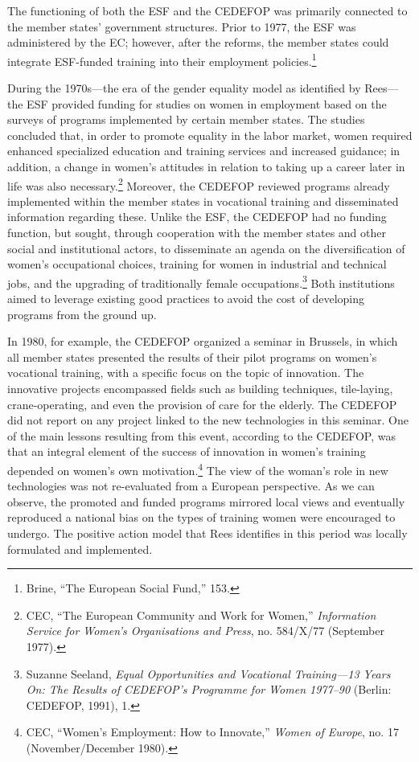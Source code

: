 \documentclass{tufte-handout}
\begin{document}
The functioning of both the ESF and the CEDEFOP was primarily connected
to the member states' government structures. Prior to 1977, the ESF was
administered by the EC; however, after the reforms, the member states
could integrate ESF-funded training into their employment
policies.\footnote{Brine, ``The European Social Fund,'' 153.}

During the 1970s---the era of the gender equality model as identified by
Rees---the ESF provided funding for studies on women in employment based
on the surveys of programs implemented by certain member states. The
studies concluded that, in order to promote equality in the labor
market, women required enhanced specialized education and training
services and increased guidance; in addition, a change in women's
attitudes in relation to taking up a career later in life was also
necessary.\footnote{CEC, ``The European Community and Work for Women,''
  \emph{Information Service for Women's Organisations and Press}, no.
  584/X/77 (September 1977).} Moreover, the CEDEFOP reviewed programs
already implemented within the member states in vocational training and
disseminated information regarding these. Unlike the ESF, the CEDEFOP
had no funding function, but sought, through cooperation with the member
states and other social and institutional actors, to disseminate an
agenda on the diversification of women's occupational choices, training
for women in industrial and technical jobs, and the upgrading of
traditionally female occupations.\footnote{Suzanne Seeland, \emph{Equal
  Opportunities and Vocational Training---13 Years On: The Results of
  CEDEFOP's Programme for Women 1977--90} (Berlin: CEDEFOP, 1991), 1.}
Both institutions aimed to leverage existing good practices to avoid the
cost of developing programs from the ground up.

In 1980, for example, the CEDEFOP organized a seminar in Brussels, in
which all member states presented the results of their pilot programs on
women's vocational training, with a specific focus on the topic of
innovation. The innovative projects encompassed fields such as building
techniques, tile-laying, crane-operating, and even the provision of care
for the elderly. The CEDEFOP did not report on any project linked to the
new technologies in this seminar. One of the main lessons resulting from
this event, according to the CEDEFOP, was that an integral element of
the success of innovation in women's training depended on women's own
motivation.\footnote{CEC, ``Women's Employment: How to Innovate,''
  \emph{Women of Europe}, no. 17 (November/December 1980).} The view of
the woman's role in new technologies was not re-evaluated from a
European perspective. As we can observe, the promoted and funded
programs mirrored local views and eventually reproduced a national bias
on the types of training women were encouraged to undergo. The positive
action model that Rees identifies in this period was locally formulated
and implemented.
\end{document}
